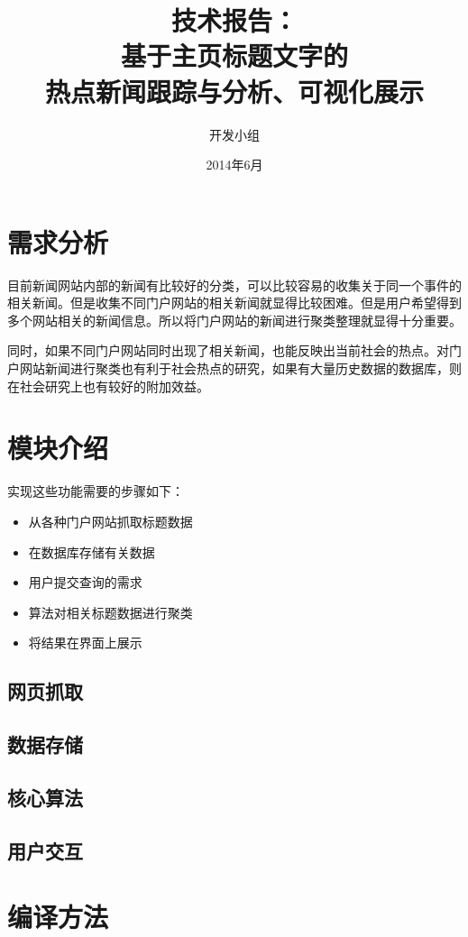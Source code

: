 \documentclass[12pt]{article}
\begin{document}
\title{技术报告：\\[3ex] 基于主页标题文字的\\热点新闻跟踪与分析、可视化展示\\[3ex]}

\author{开发小组}

\date{2014年6月}
\maketitle
\newpage
\renewcommand{\contentsname}{技术报告}
\tableofcontents
\newpage
\section{需求分析}
目前新闻网站内部的新闻有比较好的分类，可以比较容易的收集关于同一个事件的相关新闻。但是收集不同门户网站的相关新闻就显得比较困难。但是用户希望得到多个网站相关的新闻信息。所以将门户网站的新闻进行聚类整理就显得十分重要。

同时，如果不同门户网站同时出现了相关新闻，也能反映出当前社会的热点。对门户网站新闻进行聚类也有利于社会热点的研究，如果有大量历史数据的数据库，则在社会研究上也有较好的附加效益。

\section{模块介绍}
实现这些功能需要的步骤如下：
\begin{itemize}
\item 从各种门户网站抓取标题数据
\item 在数据库存储有关数据
\item 用户提交查询的需求
\item 算法对相关标题数据进行聚类
\item 将结果在界面上展示
\end{itemize}

\subsection{网页抓取}

\subsection{数据存储}

\subsection{核心算法}

\subsection{用户交互}


\section{编译方法}
\end{document}

